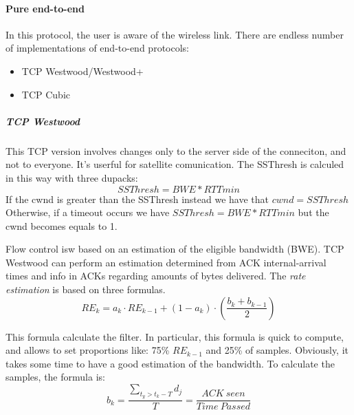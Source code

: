 \paragraph*{Pure end-to-end} In this protocol, the user is aware of the wireless
link. There are endless number of implementations of end-to-end protocols:
\begin{itemize}
\item TCP Westwood/Westwood+
\item TCP Cubic 
\end{itemize}

\subparagraph*{TCP Westwood} This TCP version involves changes only to the
server side of the conneciton, and not to everyone. It's userful for satellite
comunication.
The SSThresh is calculed in this way with three dupacks:
\begin{equation}
SSThresh = BWE * RTTmin
\end{equation}
If the cwnd is greater than the SSThresh instead we have that $cwnd=SSThresh$
Otherwise, if a timeout occurs we have $SSThresh = BWE * RTTmin$ but the cwnd
becomes equals to 1.

Flow control isw based on an estimation of the eligible bandwidth (BWE). TCP
Westwood can perform an estimation determined from ACK internal-arrival times
and info in ACKs regarding amounts of bytes delivered. The \textit{rate
  estimation} is based on three formulas.
\begin{equation}
  RE_k = a_k \cdot RE_{k-1} + (1 - a_k) \cdot (\frac{b_k + b_{k-1}}{2})
\end{equation}

This formula calculate the filter. In particular, this formula is quick to
compute, and allows to set proportions like: 75\% $RE_{k-1}$ and 25\% of
samples. Obviously, it takes some time to have a good estimation of the
bandwidth.
To calculate the samples, the formula is:
\begin{equation}
b_k = \frac{ \sum_{t_y > t_k-T} d_j }{T} = \frac{ACK\ seen}{Time\ Passed}
\end{equation}

